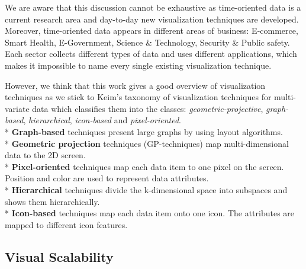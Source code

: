 We are aware that this discussion cannot be exhaustive as time-oriented data is a current research area and day-to-day new visualization techniques are developed.
Moreover, time-oriented data appears in different areas of business: E-commerce, Smart Health, E-Government, Science \& Technology, Security \& Public safety. Each sector collects different types of data and uses different applications, which makes it impossible to name every single existing visualization technique.


However, we think that this work gives a good overview of visualization techniques as we stick to Keim's taxonomy\cite{Keim1995} of visualization techniques for multi-variate data which classifies them into the classes: \textit{geometric-projective}, \textit{graph-based}, \textit{hierarchical}, \textit{icon-based} and \textit{pixel-oriented}.
\\*
\textbf{Graph-based} techniques present large graphs by using layout algorithms\cite{Keim1996}.\\*
\textbf{Geometric projection} techniques (GP-techniques) map multi-dimensional data to the 2D screen\cite{FerreiradeOliveira2003}.\\*
\textbf{Pixel-oriented} techniques map each data item to one pixel on the screen. Position and color are used to represent data attributes\cite{Keim1996}.\\*
\textbf{Hierarchical} techniques divide the k-dimensional space into subspaces and shows them hierarchically. \\*
\textbf{Icon-based} techniques map each data item onto one icon. The attributes are mapped to different icon features\cite{Keim2001}.

\subsection{Visual Scalability}\label{scalability}

